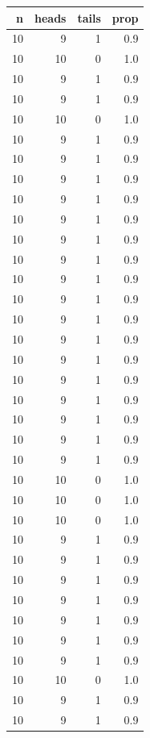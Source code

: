\documentclass[]{tufte-book}
\begin{document}
\begin{enumerate}
  \begin{tabular}{r|r|r|r}
  \hline
  n & heads & tails & prop\\
  \hline
  10 & 9 & 1 & 0.9\\
  \hline
  10 & 10 & 0 & 1.0\\
  \hline
  10 & 9 & 1 & 0.9\\
  \hline
  10 & 9 & 1 & 0.9\\
  \hline
  10 & 10 & 0 & 1.0\\
  \hline
  10 & 9 & 1 & 0.9\\
  \hline
  10 & 9 & 1 & 0.9\\
  \hline
  10 & 9 & 1 & 0.9\\
  \hline
  10 & 9 & 1 & 0.9\\
  \hline
  10 & 9 & 1 & 0.9\\
  \hline
  10 & 9 & 1 & 0.9\\
  \hline
  10 & 9 & 1 & 0.9\\
  \hline
  10 & 9 & 1 & 0.9\\
  \hline
  10 & 9 & 1 & 0.9\\
  \hline
  10 & 9 & 1 & 0.9\\
  \hline
  10 & 9 & 1 & 0.9\\
  \hline
  10 & 9 & 1 & 0.9\\
  \hline
  10 & 9 & 1 & 0.9\\
  \hline
  10 & 9 & 1 & 0.9\\
  \hline
  10 & 9 & 1 & 0.9\\
  \hline
  10 & 9 & 1 & 0.9\\
  \hline
  10 & 9 & 1 & 0.9\\
  \hline
  10 & 10 & 0 & 1.0\\
  \hline
  10 & 10 & 0 & 1.0\\
  \hline
  10 & 10 & 0 & 1.0\\
  \hline
  10 & 9 & 1 & 0.9\\
  \hline
  10 & 9 & 1 & 0.9\\
  \hline
  10 & 9 & 1 & 0.9\\
  \hline
  10 & 9 & 1 & 0.9\\
  \hline
  10 & 9 & 1 & 0.9\\
  \hline
  10 & 9 & 1 & 0.9\\
  \hline
  10 & 9 & 1 & 0.9\\
  \hline
  10 & 10 & 0 & 1.0\\
  \hline
  10 & 9 & 1 & 0.9\\
  \hline
  10 & 9 & 1 & 0.9\\

\end{tabular}
\end{enumerate}
\end{document}
